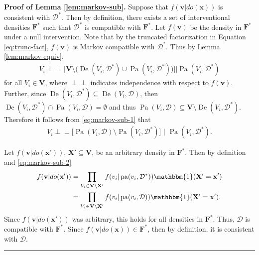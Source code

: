 \documentclass[11pt]{article}
\DeclareMathOperator{\Pa}{Pa}
\DeclareMathOperator{\pa}{pa}
\DeclareMathOperator{\De}{De}
\newcommand{\BlackBox}{\rule{1.5ex}{1.5ex}}  %
\newcommand{\mb}[1]{\mathbf{#1}}
\newcommand{\g}[1][G]{\mathcal{#1}}
\newcommand{\ind}{\perp\!\!\!\!\perp}
\newenvironment{proofof}[1][]{\noindent \textbf{Proof of #1.}}{\hfill\BlackBox}
\begin{document}
\begin{proofof}[Lemma \ref{lem:markov-sub}]
    Suppose that $f(\mb{v} | do(\mb{x}))$ is consistent with $\g[D]^*$. Then by definition, there exists a set of interventional densities $\mb{F^*}$ such that $\g[D]^*$ is compatible with $\mb{F^*}$. Let $f(\mb{v})$ be the density in $\mb{F^*}$ under a null intervention. Note that by the truncated factorization in Equation \eqref{eq:trunc-fact}, $f(\mb{v})$ is Markov compatible with $\g[D]^*$. Thus by Lemma \ref{lem:markov-equiv},
    \begin{align}
        V_i \ind \Big[ \mb{V} \setminus \big( \De(V_i, \g[D]^*) \cup \Pa(V_i,\g[D]^*) \big) \Big] | \Pa(V_i, \g[D]^*) \label{eq:markov-sub-1}
    \end{align}
    for all $V_i \in \mb{V}$, where $\ind$ indicates independence with respect to $f(\mb{v})$. Further, since $\De(V_i,\g[D]^*) \subseteq \De(V_i,\g[D])$, then $\De(V_i,\g[D]^*) \cap \Pa(V_i,\g[D]) = \emptyset$ and thus $\Pa(V_i,\g[D]) \subseteq \mb{V} \setminus \De(V_i, \g[D]^*)$. Therefore it follows from \eqref{eq:markov-sub-1} that
    \begin{align} 
        V_i \ind \Big[ \Pa(V_i,\g[D]) \setminus \Pa(V_i,\g[D]^*) \Big] \,\, \Big| \,\, \Pa(V_i,\g[D]^*). \label{eq:markov-sub-2}
    \end{align}
    
    Let $f(\mb{v} | do(\mb{x'}))$, $\mb{X'} \subseteq \mb{V}$, be an arbitrary density in $\mb{F^*}$. Then by definition and \eqref{eq:markov-sub-2}
    \begin{align*}
        f(\mb{v} | do(\mb{x'})) &= \prod_{V_i \in \mb{V} \setminus \mb{X'}} f(v_i|\pa(v_i,\g[D]^*)) \mathbbm{1}(\mb{X'} = \mb{x'})\\
                                &= \prod_{V_i \in \mb{V} \setminus \mb{X'}} f(v_i|\pa(v_i,\g[D])) \mathbbm{1}(\mb{X'} = \mb{x'}).
    \end{align*}
    Since $f(\mb{v} | do(\mb{x'}))$ was arbitrary, this holds for all densities in $\mb{F^*}$. Thus, $\g[D]$ is compatible with $\mb{F^*}$. Since $f(\mb{v} | do(\mb{x})) \in \mb{F^*}$, then by definition, it is consistent with $\g[D]$.
\end{proofof}










\end{document}
